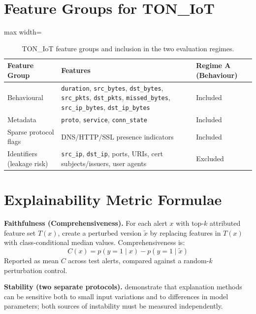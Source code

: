 \documentclass[12pt,a4paper]{report}
\begin{document}
\chapter{Feature Groups for TON\_IoT}
\label{app:features}

\begin{table}[H]
\centering
\caption{TON\_IoT feature groups and inclusion in the two evaluation regimes.}
\label{tab:features}
\begin{adjustbox}{max width=\textwidth}
\begin{tabular}{p{3.5cm}p{6cm}p{3cm}}
\toprule
\textbf{Feature Group} & \textbf{Features} & \textbf{Regime A (Behaviour)} \\
\midrule
Behavioural & \texttt{duration}, \texttt{src\_bytes}, \texttt{dst\_bytes}, \texttt{src\_pkts}, \texttt{dst\_pkts}, \texttt{missed\_bytes}, \texttt{src\_ip\_bytes}, \texttt{dst\_ip\_bytes} & Included \\
\addlinespace
Metadata & \texttt{proto}, \texttt{service}, \texttt{conn\_state} & Included \\
\addlinespace
Sparse protocol flags & DNS/HTTP/SSL presence indicators & Included \\
\addlinespace
Identifiers (leakage risk) & \texttt{src\_ip}, \texttt{dst\_ip}, ports, URIs, cert subjects/issuers, user agents & Excluded \\
\bottomrule
\end{tabular}
\end{adjustbox}
\end{table}

\chapter{Explainability Metric Formulae}
\label{app:formulae}

\noindent\textbf{Faithfulness (Comprehensiveness).} For each alert $x$ with top-$k$ attributed feature set $T(x)$, create a perturbed version $\tilde{x}$ by replacing features in $T(x)$ with class-conditional median values. Comprehensiveness is:
\begin{equation}
C(x) = p(y=1 \mid x) - p(y=1 \mid \tilde{x})
\end{equation}
Reported as mean $C$ across test alerts, compared against a random-$k$ perturbation control.

\vspace{1em}
\noindent\textbf{Stability (two separate protocols).} \cite{alvarez2018} demonstrate that explanation methods can be sensitive both to small input variations and to differences in model parameters; both sources of instability must be measured independently.
\end{document}
